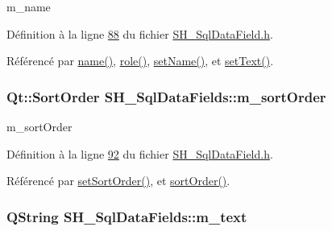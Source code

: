 m\-\_\-name 



Définition à la ligne \hyperlink{SH__SqlDataField_8h_source_l00088}{88} du fichier \hyperlink{SH__SqlDataField_8h_source}{S\-H\-\_\-\-Sql\-Data\-Field.\-h}.



Référencé par \hyperlink{classSH__SqlDataFields_a4951291928ce837435411166d66a5a3f}{name()}, \hyperlink{classSH__SqlDataFields_a6e5a9b95f0249a85ccf2fd0844ab7170}{role()}, \hyperlink{classSH__SqlDataFields_a8d7b864a4ad5513af9e4c47a0d9919e8}{set\-Name()}, et \hyperlink{classSH__SqlDataFields_ae098408de73ecbd532de8f44dea2b6d0}{set\-Text()}.

\hypertarget{classSH__SqlDataFields_aa5dbfa2beef7114fba275d61135a6760}{
\subsubsection[{m\-\_\-sort\-Order}]{\setlength{\rightskip}{0pt plus 5cm}Qt\-::\-Sort\-Order S\-H\-\_\-\-Sql\-Data\-Fields\-::m\-\_\-sort\-Order\hspace{0.3cm}{\ttfamily [private]}}}\label{classSH__SqlDataFields_aa5dbfa2beef7114fba275d61135a6760}


m\-\_\-sort\-Order 



Définition à la ligne \hyperlink{SH__SqlDataField_8h_source_l00092}{92} du fichier \hyperlink{SH__SqlDataField_8h_source}{S\-H\-\_\-\-Sql\-Data\-Field.\-h}.



Référencé par \hyperlink{classSH__SqlDataFields_a32a7c040a081d39594245e1a4a68f70d}{set\-Sort\-Order()}, et \hyperlink{classSH__SqlDataFields_af7ecc3a493545e81e6959d778352d9ac}{sort\-Order()}.

\hypertarget{classSH__SqlDataFields_a55352d3aea0863fcab26c948babe8523}{
\subsubsection[{m\-\_\-text}]{\setlength{\rightskip}{0pt plus 5cm}Q\-String S\-H\-\_\-\-Sql\-Data\-Fields\-::m\-\_\-text\hspace{0.3cm}{\ttfamily [private]}}}\label{classSH__SqlDataFields_a55352d3aea0863fcab26c948babe8523}


